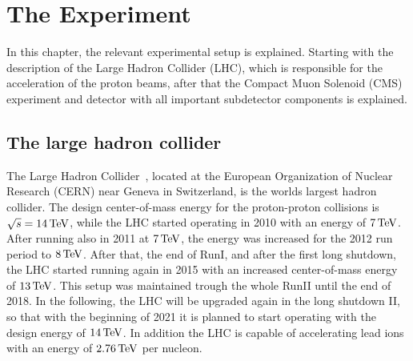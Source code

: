 \chapter{The Experiment}\label{chap:experiment}
In this chapter, the relevant experimental setup is explained. Starting with the description of the Large Hadron Collider (LHC), which is responsible for the acceleration of the proton beams, after that the Compact Muon Solenoid (CMS) experiment and detector with all important subdetector components is explained.
\section{The large hadron collider}\label{sec:LHC}
The Large Hadron Collider~\cite{LHC1,LHC2}, located at the European Organization of Nuclear Research (CERN) near Geneva in Switzerland, is the worlds largest hadron collider. The design center-of-mass energy for the proton-proton collisions is $\sqrt{s}=14\,\text{Te\hspace{-.08em}V}$, while the LHC started operating in 2010 with an energy of $7\,\text{Te\hspace{-.08em}V}$. After running also in 2011 at $7\,\text{Te\hspace{-.08em}V}$, the energy was increased for the 2012 run period to $8\,\text{Te\hspace{-.08em}V}$. After that, the end of RunI, and after the first long shutdown, the LHC started running again in 2015 with an increased center-of-mass energy of $13\,\text{Te\hspace{-.08em}V}$. This setup was maintained trough the whole RunII until the end of 2018. In the following, the LHC will be upgraded again in the long shutdown II, so that with the beginning of 2021 it is planned to start operating with the design energy of $14\,\text{Te\hspace{-.08em}V}$.
In addition the LHC is capable of accelerating lead ions with an energy of $2.76\,\text{Te\hspace{-.08em}V}$ per nucleon.\\
